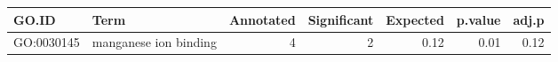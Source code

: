 \begin{table}[ht]
\centering
\begin{tabular}{llrrrrr}
  \hline
GO.ID & Term & Annotated & Significant & Expected & p.value & adj.p \\ 
  \hline
GO:0030145 & manganese ion binding &   4 &   2 & 0.12 & 0.01 & 0.12 \\ 
   \hline
\end{tabular}
\end{table}
